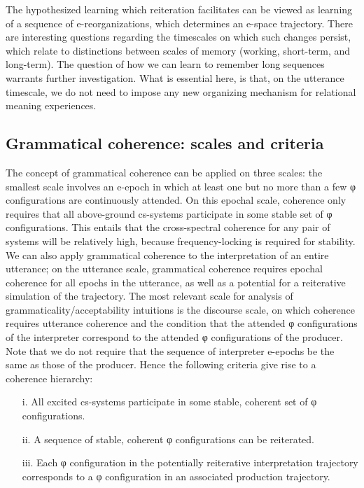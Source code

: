   The hypothesized learning which reiteration facilitates can be viewed as learning of a sequence of e-reorganizations, which determines an e-space trajectory. There are interesting questions regarding the timescales on which such changes persist, which relate to distinctions between scales of memory (working, short-term, and long-term). The question of how we can learn to remember long sequences warrants further investigation. What is essential here, is that, on the utterance timescale, we do not need to impose any new organizing mechanism for relational meaning experiences. 

\subsection{Grammatical coherence: scales and criteria}

The concept of grammatical coherence can be applied on three scales: the smallest scale involves an e-epoch in which at least one but no more than a few φ configurations are continuously attended. On this epochal scale, coherence only requires that all above-ground cs-systems participate in some stable set of φ configurations. This entails that the cross-spectral coherence for any pair of systems will be relatively high, because frequency-locking is required for stability. We can also apply grammatical coherence to the interpretation of an entire utterance; on the utterance scale, grammatical coherence requires epochal coherence for all epochs in the utterance, as well as a potential for a reiterative simulation of the trajectory. The most relevant scale for analysis of grammaticality/acceptability intuitions is the discourse scale, on which coherence requires utterance coherence and the condition that the attended φ configurations of the interpreter correspond to the attended φ configurations of the producer. Note that we do not require that the sequence of interpreter e-epochs be the same as those of the producer. Hence the following criteria give rise to a coherence hierarchy:

\begin{itemize}
\item[i.] 
All excited cs-systems participate in some stable, coherent set of φ configurations.
\item[ii.] 
A sequence of stable, coherent φ configurations can be reiterated.
\item[iii.] 
Each φ configuration in the potentially reiterative interpretation trajectory corresponds to a φ configuration in an associated production trajectory.
\end{itemize}

